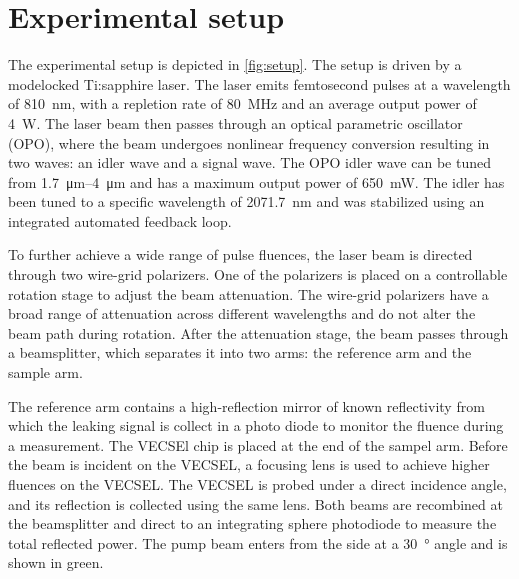 \section{Experimental setup}\label{sec:setup}

The experimental setup is depicted in \cref{fig:setup}. The setup is driven by a modelocked Ti:sapphire laser. The laser emits femtosecond pulses at a wavelength of \qty{810}{\nm}, with a repletion rate of \qty{80}{\MHz} and an average output power of \qty{4}{\W}. The laser beam then passes through an optical parametric oscillator (OPO), where the beam undergoes nonlinear frequency conversion resulting in two waves: an idler wave and a signal wave. The OPO idler wave can be tuned from \qtyrange{1.7}{4}{\um} and has a maximum output power of \qty{650}{\mW}. The idler has been tuned to a specific wavelength of \qty{2071.7}{\nm} and was stabilized using an integrated automated feedback loop.

To further achieve a wide range of pulse fluences, the laser beam is directed through two wire-grid polarizers. One of the polarizers is placed on a controllable rotation stage to adjust the beam attenuation. The wire-grid polarizers have a broad range of attenuation across different wavelengths and do not alter the beam path during rotation. After the attenuation stage, the beam passes through a beamsplitter, which separates it into two arms: the reference arm and the sample arm. 

The reference arm contains a high-reflection mirror of known reflectivity from which the leaking signal is collect in a photo diode to monitor the fluence during a measurement. 
The VECSEl chip is placed at the end of the sampel arm. Before the beam is incident on the VECSEL, a focusing lens is used to achieve higher fluences on the VECSEL. The VECSEL is probed under a direct incidence angle, and its reflection is collected using the same lens. Both beams are recombined at the beamsplitter and direct to an integrating sphere photodiode to measure the total reflected power. The pump beam enters from the side at a \qty{30}{\degree} angle and is shown in green. 

